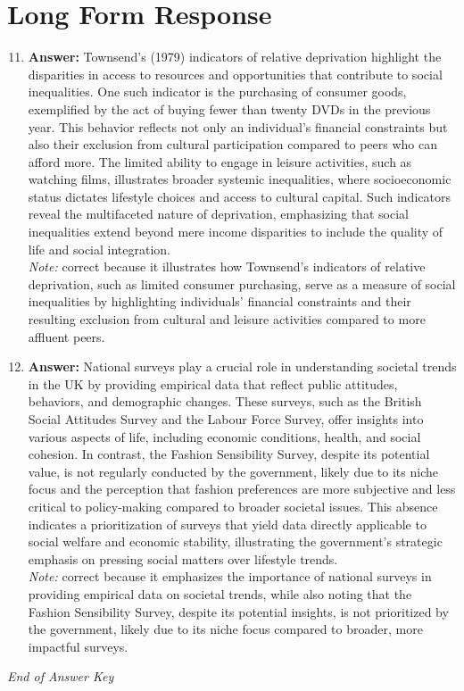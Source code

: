 \documentclass[12pt]{article}
\begin{document}
\section*{Long Form Response}
\begin{enumerate}[label=\arabic*.]
\setcounter{enumi}{10}
\item \textbf{Answer:} Townsend's (1979) indicators of relative deprivation highlight the disparities in access to resources and opportunities that contribute to social inequalities. One such indicator is the purchasing of consumer goods, exemplified by the act of buying fewer than twenty DVDs in the previous year. This behavior reflects not only an individual's financial constraints but also their exclusion from cultural participation compared to peers who can afford more. The limited ability to engage in leisure activities, such as watching films, illustrates broader systemic inequalities, where socioeconomic status dictates lifestyle choices and access to cultural capital. Such indicators reveal the multifaceted nature of deprivation, emphasizing that social inequalities extend beyond mere income disparities to include the quality of life and social integration.
\\ \textit{Note:} correct because it illustrates how Townsend's indicators of relative deprivation, such as limited consumer purchasing, serve as a measure of social inequalities by highlighting individuals' financial constraints and their resulting exclusion from cultural and leisure activities compared to more affluent peers.
\item \textbf{Answer:} National surveys play a crucial role in understanding societal trends in the UK by providing empirical data that reflect public attitudes, behaviors, and demographic changes. These surveys, such as the British Social Attitudes Survey and the Labour Force Survey, offer insights into various aspects of life, including economic conditions, health, and social cohesion. In contrast, the Fashion Sensibility Survey, despite its potential value, is not regularly conducted by the government, likely due to its niche focus and the perception that fashion preferences are more subjective and less critical to policy-making compared to broader societal issues. This absence indicates a prioritization of surveys that yield data directly applicable to social welfare and economic stability, illustrating the government's strategic emphasis on pressing social matters over lifestyle trends.
\\ \textit{Note:} correct because it emphasizes the importance of national surveys in providing empirical data on societal trends, while also noting that the Fashion Sensibility Survey, despite its potential insights, is not prioritized by the government, likely due to its niche focus compared to broader, more impactful surveys.
\end{enumerate}

\vfill
\noindent\textit{End of Answer Key}
\end{document}
